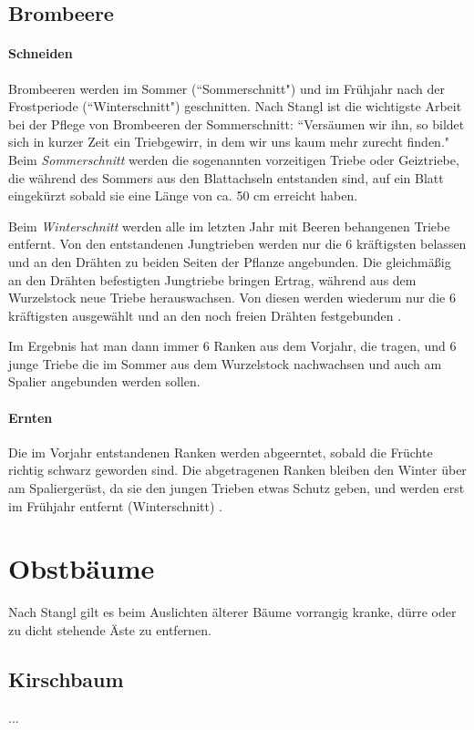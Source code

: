 \subsection{Brombeere}
\label{Brombeere}

\paragraph{Schneiden}


Brombeeren werden im Sommer (``Sommerschnitt") und im Frühjahr nach der Frostperiode (``Winterschnitt") geschnitten.
Nach Stangl \cite[S.~196]{Stangl1995} ist die wichtigste Arbeit bei der Pflege von Brombeeren der Sommerschnitt:
``Versäumen wir ihn, so bildet sich in kurzer Zeit ein Triebgewirr, in dem wir uns kaum mehr zurecht finden."
Beim \textit{Sommerschnitt} werden die sogenannten vorzeitigen Triebe oder Geiztriebe, die während des Sommers aus den Blattachseln entstanden sind, auf ein Blatt eingekürzt sobald sie eine Länge von ca. 50 cm erreicht haben.

Beim \textit{Winterschnitt} werden alle im letzten Jahr mit Beeren behangenen Triebe entfernt.
Von den entstandenen Jungtrieben werden nur die 6 kräftigsten belassen und an den Drähten zu beiden Seiten der Pflanze angebunden.
Die gleichmäßig an den Drähten befestigten Jungtriebe bringen Ertrag, während aus dem Wurzelstock neue Triebe herauswachsen.
Von diesen werden wiederum nur die 6 kräftigsten ausgewählt und an den noch freien Drähten festgebunden \cite[S.~197]{Stangl1995}.

Im Ergebnis hat man dann immer 6 Ranken aus dem Vorjahr, die tragen, und 6 junge Triebe die im Sommer aus dem Wurzelstock nachwachsen und auch am Spalier angebunden werden sollen.

\paragraph{Ernten}

Die im Vorjahr entstandenen Ranken werden abgeerntet, sobald die Früchte richtig schwarz geworden sind.
Die abgetragenen Ranken bleiben den Winter über am Spaliergerüst, da sie den jungen Trieben etwas Schutz geben, und werden erst im Frühjahr entfernt (\textrightarrow Winterschnitt) \cite[S.~197]{Stangl1995}.

\pagebreak

\section{Obstbäume}
\label{Bäume}

Nach Stangl \cite[S.~256]{Stangl1995} gilt es beim Auslichten älterer Bäume vorrangig kranke, dürre oder zu dicht stehende Äste zu entfernen.

\subsection{Kirschbaum}
...



\pagebreak